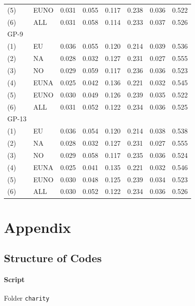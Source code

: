 \begin{table}[H]
\begin{tabular}{llrrrrrr}
		(5)   & EUNO   &   0.031 &   0.055 &   0.117 &   0.238 &   0.036 &   0.522 \\
		(6)   & ALL    &   0.031 &   0.058 &   0.114 &   0.233 &   0.037 &   0.526 \\ \hline
		GP-9  &        &         &         &         &         &         &         \\
		(1)   & EU     &   0.036 &   0.055 &   0.120 &   0.214 &   0.039 &   0.536 \\
		(2)   & NA     &   0.028 &   0.032 &   0.127 &   0.231 &   0.027 &   0.555 \\
		(3)   & NO     &   0.029 &   0.059 &   0.117 &   0.236 &   0.036 &   0.523 \\
		(4)   & EUNA   &   0.025 &   0.042 &   0.136 &   0.221 &   0.032 &   0.545 \\
		(5)   & EUNO   &   0.030 &   0.049 &   0.126 &   0.239 &   0.035 &   0.522 \\
		(6)   & ALL    &   0.031 &   0.052 &   0.122 &   0.234 &   0.036 &   0.525 \\ \hline
		GP-13 &        &         &         &         &         &         &         \\
		(1)   & EU     &   0.036 &   0.054 &   0.120 &   0.214 &   0.038 &   0.538 \\
		(2)   & NA     &   0.028 &   0.032 &   0.127 &   0.231 &   0.027 &   0.555 \\
		(3)   & NO     &   0.029 &   0.058 &   0.117 &   0.235 &   0.036 &   0.524 \\
		(4)   & EUNA   &   0.025 &   0.041 &   0.135 &   0.221 &   0.032 &   0.546 \\
		(5)   & EUNO   &   0.030 &   0.048 &   0.125 &   0.239 &   0.034 &   0.523 \\
		(6)   & ALL    &   0.030 &   0.052 &   0.122 &   0.234 &   0.036 &   0.526 \\ \hline\hline
	\end{tabular}
\end{table}

\section{Appendix}

\subsection{Structure of Codes}

\paragraph{Script} Folder \texttt{charity}

